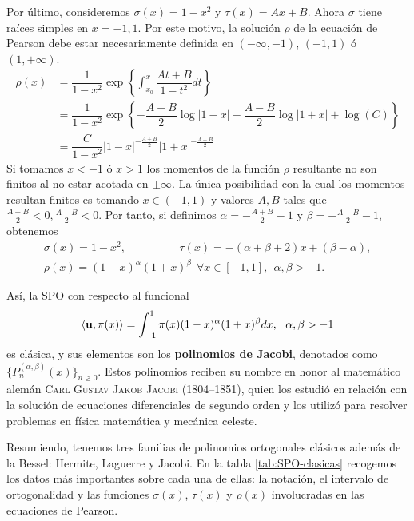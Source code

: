Por último, consideremos $\sigma(x) = 1-x^2$ y $\tau(x)=Ax+B$. Ahora $\sigma$ tiene raíces simples en $x=-1,1$. Por este motivo, la solución $\rho$ de la ecuación de Pearson debe estar necesariamente definida en $(-\infty,-1)$, $(-1,1)$ ó $(1,+\infty)$.
\begin{equation*}
    \begin{split}
        \rho(x)&=\dfrac{1}{1-x^2}\exp\left\{\int_{x_0}^x\dfrac{At+B}{1-t^2}dt\right\}\\
        &= \dfrac{1}{1-x^2}\exp\left\{-\dfrac{A+B}{2}\log|1-x|-\dfrac{A-B}{2}\log|1+x|+\log(C)\right\}\\
        &= \dfrac{C}{1-x^2}|1-x|^{-\frac{A+B}{2}}|1+x|^{-\frac{A-B}{2}}
    \end{split}
\end{equation*}
Si tomamos $x<-1$ ó $x>1$ los momentos de la función $\rho$ resultante no son finitos al no estar acotada en $\pm\infty$. La única posibilidad con la cual los momentos resultan finitos es tomando $x\in(-1,1)$ y valores $A,B$ tales que $\frac{A+B}{2}<0, \frac{A-B}{2}<0$. Por tanto, si definimos $\alpha = -\frac{A+B}{2}-1$ y $\beta=-\frac{A-B}{2}-1$, obtenemos
\begin{equation}
    \label{eq:parametros-jacobi}
    \begin{array}{c}
        \sigma(x)=1-x^2,\hspace{2cm} \tau(x)=-(\alpha+\beta+2)x+(\beta-\alpha), \\ 
        \rho(x) =(1-x)^{\alpha}(1+x)^{\beta}\ \ \forall x \in[-1,1], \ \ \alpha,\beta > -1.
    \end{array}
\end{equation}

Así, la SPO con respecto al funcional
\begin{equation}
    \label{eq:func-jacobi}
    \left\langle \mathbf{u} , \pi(x) \right\rangle = \int_{-1}^1 \pi(x)(1-x)^{\alpha}(1+x)^{\beta}dx, \ \ \alpha,\beta > -1
\end{equation}
es clásica, y sus elementos son los \textbf{polinomios de Jacobi}, denotados como $\{P_n^{(\alpha,\beta)}(x)\}_{n\geq 0}$. Estos polinomios reciben su nombre en honor al matemático alemán \textsc{Carl Gustav Jakob Jacobi} (1804--1851), quien los estudió en relación con la solución de ecuaciones diferenciales de segundo orden y los utilizó para resolver problemas en física matemática y mecánica celeste.

Resumiendo, tenemos tres familias de polinomios ortogonales clásicos además de la Bessel: Hermite, Laguerre y Jacobi. En la tabla \ref{tab:SPO-clasicas} recogemos los datos más importantes sobre cada una de ellas: la notación, el intervalo de ortogonalidad y las funciones $\sigma(x)$, $\tau(x)$ y $\rho(x)$ involucradas en las ecuaciones de Pearson.

